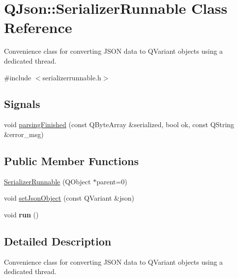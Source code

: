\hypertarget{class_q_json_1_1_serializer_runnable}{
\section{\-Q\-Json\-:\-:\-Serializer\-Runnable \-Class \-Reference}
\label{class_q_json_1_1_serializer_runnable}
}


\-Convenience class for converting \-J\-S\-O\-N data to \-Q\-Variant objects using a dedicated thread.  




{\ttfamily \#include $<$serializerrunnable.\-h$>$}

\subsection*{\-Signals}
\begin{DoxyCompactItemize}
\item 
void \hyperlink{class_q_json_1_1_serializer_runnable_ad1269213d1dc85522dcfccef77edf4e2}{parsing\-Finished} (const \-Q\-Byte\-Array \&serialized, bool ok, const \-Q\-String \&error\-\_\-msg)
\end{DoxyCompactItemize}
\subsection*{\-Public \-Member \-Functions}
\begin{DoxyCompactItemize}
\item 
\hyperlink{class_q_json_1_1_serializer_runnable_a7098e56db6425e0171f81ce7c16cffa0}{\-Serializer\-Runnable} (\-Q\-Object $\ast$parent=0)
\item 
void \hyperlink{class_q_json_1_1_serializer_runnable_ad58725ef18c20db115deb028ed7db80f}{set\-Json\-Object} (const \-Q\-Variant \&json)
\item 
\hypertarget{class_q_json_1_1_serializer_runnable_ac4b745722fa882a609209390f0604fa6}{
void {\bfseries run} ()}
\label{class_q_json_1_1_serializer_runnable_ac4b745722fa882a609209390f0604fa6}

\end{DoxyCompactItemize}


\subsection{\-Detailed \-Description}
\-Convenience class for converting \-J\-S\-O\-N data to \-Q\-Variant objects using a dedicated thread. 

